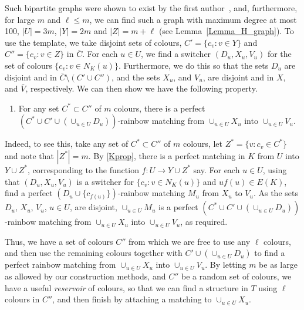 Such bipartite graphs were shown to exist by the first author~\cite{montgomery2018spanning}, and, furthermore, for large $m$ and $\ell\leq m$, we can find such a graph with maximum degree at most 100, $|U|=3m$, $|Y|=2m$ and $|Z|=m+\ell$ (see Lemma~\ref{Lemma_H_graph}). 
To use the template, we take disjoint sets of colours, $C'=\{c_v:v\in Y\}$ and $C''=\{c_v:v\in Z\}$ in $\bar{C}$. For each $u\in U$, we find a switcher $(D_u,X_u,V_u)$ for the set of colours $\{c_v:v\in N_K(u)\}$. Furthermore, we do this so that the sets $D_u$ are disjoint and in $\bar{C}\setminus (C'\cup C'')$, and the sets $X_u$, and $V_u$, are disjoint and in $X$, and $\bar{V}$, respectively.  We can then show we have the following property.
\begin{enumerate}[label = {\bfseries \Alph{propcounter}\arabic{enumi}}]\addtocounter{enumi}{2}
\item For any set $C^*\subset C''$ of $m$ colours, there is a perfect $(C^*\cup C'\cup(\cup_{u\in U}D_u))$-rainbow matching from $\cup_{u\in U}X_u$ into $\cup_{u\in U}V_u$.\label{Kprop}
\end{enumerate}
Indeed, to see this, take any set of $C^*\subset C''$ of $m$ colours, let $Z^*=\{v:c_v\in C^*\}$ and note that $|Z^*|=m$. By \ref{Kprop}, there is a perfect matching in $K$ from $U$ into $Y\cup Z^\ast$, corresponding to the function $f:U\to Y\cup Z^*$ say. For each $u\in U$, using that $(D_u,X_u,V_u)$ is a switcher for $\{c_v:v\in N_K(u)\}$ and $uf(u)\in E(K)$, find a perfect $(D_u\cup \{c_{f(u)}\})$-rainbow matching $M_u$ from $X_u$ to $V_u$.
As the sets $D_u$, $X_u$, $V_u$, $u\in U$, are disjoint, $\cup_{u\in U}M_u$ is a perfect $(C^*\cup C'\cup(\cup_{u\in U}D_u))$-rainbow matching from $\cup_{u\in U}X_u$ into $\cup_{u\in U}V_u$, as required.

Thus, we have a set of colours $C''$ from which we are free to use any $\ell$ colours, and then use the remaining colours together with $C'\cup(\cup_{u\in U}D_u)$ to find a perfect rainbow matching from $\cup_{u\in U}X_u$ into $\cup_{u\in U}V_u$. By letting $m$ be as large as allowed by our construction methods, and $C''$ be a random set of colours, we have a useful \emph{reservoir} of colours, so that we can find a structure in $T$ using $\ell$ colours in $C''$, and then finish by attaching a matching to $\cup_{u\in U}X_u$.



